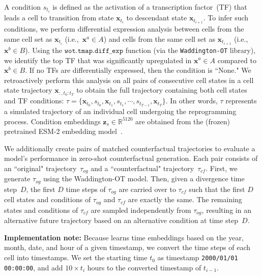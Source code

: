%
A condition $s_{t_i}$ is defined as the activation of a transcription factor~(TF) that leads a cell to transition from state $\mathbf{x}_{t_i}$ to descendant state $\mathbf{x}_{t_{i+1}}$. To infer such conditions, we perform differential expression analysis between cells from the same cell set as $\mathbf{x}_{t_i}$ (i.e.,~$\mathbf{x}^a \in A$) and cells from the same cell set as $\mathbf{x}_{t_{i+1}}$ (i.e.,~$\mathbf{x}^b \in B$). Using the $\texttt{wot.tmap.diff\_exp}$ function (via the \texttt{Waddington-OT} library), we identify the top TF that was significantly upregulated in $\mathbf{x}^a \in A$ compared to $\mathbf{x}^b \in B$. If no TFs are differentially expressed, then the condition is ``None." We retroactively perform this analysis on all pairs of consecutive cell states in a cell state trajectory $\mathbf{x}_{:,t_0:t_T}$ to obtain the full trajectory containing both cell states and TF conditions: $\tau = \{\mathbf{x}_{t_0}, s_{t_0}, \mathbf{x}_{t_1}, s_{t_1}, \cdots, s_{t_{T-1}}, \mathbf{x}_{t_T} \}$. In other words, $\tau$ represents a simulated trajectory of an individual cell undergoing the reprogramming process. Condition embeddings $\mathbf{z}_s \in \mathbb{R}^{5120}$ are obtained from the (frozen) pretrained ESM-2 embedding model~\cite{lin2022language}.

%
We additionally create pairs of matched counterfactual trajectories to evaluate a model's performance in zero-shot counterfactual generation. Each pair consists of an ``original" trajectory~$\tau_{og}$ and a ``counterfactual" trajectory~$\tau_{cf}$. First, we generate $\tau_{og}$ using the Waddington-OT model. Then, given a divergence time step~$D$, the first $D$ time steps of $\tau_{og}$ are carried over to $\tau_{cf}$ such that the first $D$ cell states and conditions of $\tau_{og}$ and $\tau_{cf}$ are exactly the same. The remaining states and conditions of $\tau_{cf}$ are sampled independently from $\tau_{og}$, resulting in an alternative future trajectory based on an alternative condition at time step~$D$. 

\textbf{Implementation note:} Because \name learns time embeddings based on the year, month, date, and hour of a given timestamp, we convert the time steps of each cell into timestamps. We set the starting time $t_0$ as timestamp \texttt{2000/01/01 00:00:00}, and add $10\times t_i$ hours to the converted timestamp of $t_{i-1}$.





